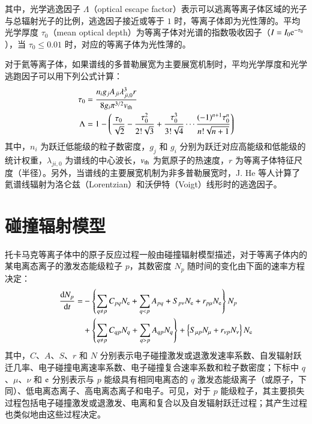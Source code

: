 其中，光学逃逸因子 $\Lambda$（optical escape factor）表示可以逃离等离子体区域的光子与总辐射光子的比例，逃逸因子接近或等于 $1$ 时，等离子体即为光性薄的。平均光学厚度 $\tau_0$（mean optical depth）为等离子体对光谱的指数吸收因子（$I=I_0{\rm e}^{-\tau_0}$），当 $\tau_0\le0.01$ 时，对应的等离子体为光性薄的。

对于氦等离子体，如果谱线的多普勒展宽为主要展宽机制时\cite{Wiese1966:book}，平均光学厚度和光学逃跑因子可以用下列公式计算\cite{Drawin1973:OEF,boivin2001}：
\begin{align}
  \tau_0&=\frac{n_ig_jA_{ji}\lambda_{ji,0}^3r}{8g_i\pi^{3/2}v_{\rm th}} \label{eq:chap02:mod}\\
  \Lambda&=1-\left(\frac{\tau_0}{\sqrt{2}}-\frac{\tau_0^2}{2!\sqrt{3}}+\frac{\tau_0^3}{3!\sqrt{4}}\cdots\frac{(-1)^{n+1}\tau_0^n}{n!\sqrt{n+1}}\right)
\end{align}
其中，$n_i$ 为跃迁低能级的粒子数密度，$g_j$ 和 $g_i$ 分别为跃迁对应高能级和低能级的统计权重，$\lambda_{ji,0}$ 为谱线的中心波长，$v_{\rm th}$ 为氦原子的热速度，$r$ 为等离子体特征尺度（半径）。另外，当谱线的主要展宽机制为非多普勒展宽时，J. He 等人\cite{HeJian2006:ef}计算了氦谱线辐射为洛仑兹（Lorentzian）和沃伊特（Voigt）线形时的逃逸因子。

\section{碰撞辐射模型}

托卡马克等离子体中的原子反应过程一般由碰撞辐射模型描述，对于等离子体内的某电离态离子的激发态能级粒子 $p$，其数密度 $N_p$ 随时间的变化由下面的速率方程决定：
\begin{equation}
\begin{aligned}
  \frac{{\rm d}N_p}{{\rm d}t}=
  &-\left\{\sum_{q\ne p}C_{pq}N_{\rm e}+\sum_{q<p}A_{pq}+S_{p\nu}N_{\rm e}+r_{p\mu}N_{\rm e}\right\}N_p\\
  &+\left\{\sum_{q\ne p}C_{qp}N_q+\sum_{q>p}A_{qp}N_q\right\}+\left\{S_{\mu p}N_{\mu}+r_{\nu p}N_\nu\right\}N_{\rm e}
\end{aligned}
\end{equation}
其中，$C$、$A$、$S$、$r$ 和 $N$ 分别表示电子碰撞激发或退激发速率系数、自发辐射跃迁几率、电子碰撞电离速率系数、电子碰撞复合速率系数和粒子数密度；下标中 $q$、$\mu$、$\nu$ 和 ${\rm e}$ 分别表示与 $p$ 能级具有相同电离态的 $q$ 激发态能级离子（或原子，下同）、低电离态离子、高电离态离子和电子。可见，对于 $p$ 能级粒子，其主要损失过程包括电子碰撞激发或退激发、电离和复合以及自发辐射跃迁过程；其产生过程也类似地由这些过程决定。

